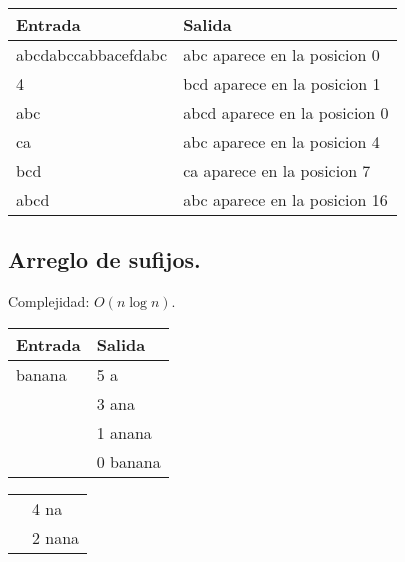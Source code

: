 \documentclass[10pt, letterpaper, twoside]{article}
\begin{document}


\begin{tabular}{|p{7cm}|p{7cm}|}
\hline
\textbf{Entrada} & \textbf{Salida}\\ \hline
abcdabccabbacefdabc & abc aparece en la posicion 0\\
4                   & bcd aparece en la posicion 1\\
abc                 & abcd aparece en la posicion 0\\
ca                  & abc aparece en la posicion 4\\
bcd                 & ca aparece en la posicion 7\\
abcd                & abc aparece en la posicion 16\\ \hline
\end{tabular}

\subsection{Arreglo de sufijos.}

Complejidad: $O(n\log n)$.



\begin{tabular}{|p{7cm}|p{7cm}|}
\hline
\textbf{Entrada} & \textbf{Salida}\\ \hline
banana & 5 a\\
       & 3 ana\\
       & 1 anana\\
       & 0 banana\\
\end{tabular}

\begin{tabular}{|p{7cm}|p{7cm}|}
       & 4 na\\
       & 2 nana\\ \hline
\end{tabular}

\end{document}

